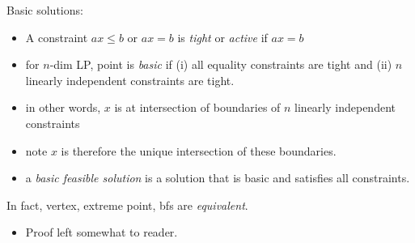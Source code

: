 \documentclass{article}
\begin{document}
Basic solutions:
\begin{itemize}
\item A constraint $ax \le b$ or $ax=b$ is {\em tight} or {\em active}
  if $ax=b$ 
\item for $n$-dim LP, point is {\em basic} if (i) all equality
  constraints are tight and (ii) $n$ linearly independent constraints
  are tight.
\item in other words, $x$ is at intersection of boundaries of $n$
  linearly independent constraints
\item note $x$ is therefore the unique intersection of these
  boundaries.
\item a {\em basic feasible solution} is a solution that is basic and
  satisfies all constraints.
\end{itemize}

In fact, vertex, extreme point, bfs are \emph{equivalent}.
\begin{itemize}
\item Proof left somewhat to reader.
\end{itemize}
\end{document}

